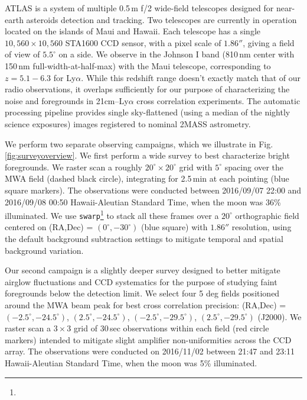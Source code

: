 \documentclass[numberedappendix]{emulateapj}
\begin{document}
ATLAS is a system of multiple 0.5\,m f/2 wide-field telescopes \citep{tonry11} designed for near-earth asteroids detection and tracking. Two telescopes are currently in operation located on the islands of Maui and Hawaii.   Each telescope has a single $10,560\times10,560$ STA1600 CCD sensor, with a pixel scale of $1.86''$, giving a field of view of $5.5^\circ$ on a side.  We observe in the Johnson I band (810\,nm center with 150\,nm full-width-at-half-max) with the Maui telescope, corresponding to $z=5.1-6.3$ for Ly$\alpha$.  While this redshift range doesn't exactly match that of our radio observations, it overlaps sufficiently for our purpose of characterizing the noise and foregrounds in 21cm--Ly$\alpha$ cross correlation experiments. The automatic processing pipeline provides single sky-flattened (using a median of the nightly science exposures) images registered to nominal 2MASS astrometry.

We perform two separate observing campaigns, which we illustrate in Fig. \ref{fig:surveyoverview}. We first perform a wide survey to best characterize bright foregrounds. We raster scan a roughly $20^\circ\times20^\circ$ grid with $5^\circ$ spacing over the MWA field (dashed black circle), integrating for 2.5\,min at each pointing (blue square markers). The observations were conducted between 2016/09/07 22:00  and 2016/09/08 00:50 Hawaii-Aleutian Standard Time, when the moon was 36\% illuminated. We use {\tt swarp}\footnote{} \citep{swarp} to stack all these frames over a $20^\circ$ orthographic field centered on (RA,Dec) = $(0^\circ,-30^\circ)$ (blue square) with $1.86''$ resolution, using the default background subtraction settings to mitigate temporal and spatial background variation. 


Our second campaign is a slightly deeper survey designed to better mitigate airglow fluctuations and CCD systematics for the purpose of studying faint foregrounds below the detection limit. We select four 5 deg fields positioned around the MWA beam peak for best cross correlation precision: (RA,Dec) = $(-2.5^\circ, -24.5^\circ)$, $(2.5^\circ, -24.5^\circ)$, $(-2.5^\circ, -29.5^\circ)$, $(2.5^\circ, -29.5^\circ)$ (J2000). We raster scan a $3\times3$ grid of 30\,sec observations within each field (red circle markers) intended to mitigate slight amplifier non-uniformities across the CCD array. The observations were conducted on 2016/11/02 between 21:47 and 23:11 Hawaii-Aleutian Standard Time, when the moon was 5\% illuminated. 
\end{document}
